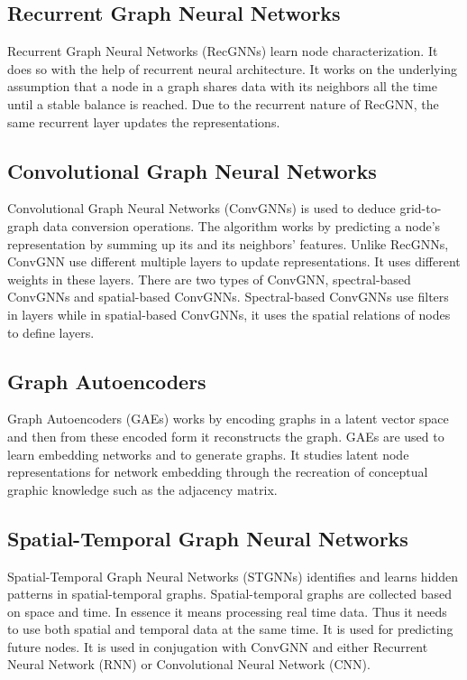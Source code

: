 \documentclass[journal,twoside,web]{ieeecolor}
\begin{document}
\subsection{Recurrent Graph Neural Networks}
Recurrent Graph Neural Networks (RecGNNs) learn node characterization. It does so with the help of recurrent neural architecture. It works on the underlying assumption that a node in a graph shares data with its neighbors all the time until a stable balance is reached. Due to the recurrent nature of RecGNN, the same recurrent layer updates the representations.

\subsection{Convolutional Graph Neural Networks}
Convolutional Graph Neural Networks (ConvGNNs) is used to deduce grid-to-graph data conversion operations. The algorithm works by predicting a node's representation by summing up its and its neighbors' features. Unlike RecGNNs, ConvGNN use different multiple layers to update representations. It uses different weights in these layers. There are two types of ConvGNN, spectral-based ConvGNNs and spatial-based ConvGNNs. Spectral-based ConvGNNs use filters in layers while in spatial-based ConvGNNs, it uses the spatial relations of nodes to define layers.

\subsection{Graph Autoencoders}
Graph Autoencoders (GAEs) works by encoding graphs in a latent vector space and then from these encoded form it reconstructs the graph. GAEs are used to learn embedding networks and to generate graphs. It studies latent node representations for network embedding through the recreation of conceptual graphic knowledge such as the adjacency matrix.

\subsection{Spatial-Temporal Graph Neural Networks}
Spatial-Temporal Graph Neural Networks (STGNNs) identifies and learns hidden patterns in spatial-temporal graphs. Spatial-temporal graphs are collected based on space and time. In essence it means processing real time data. Thus it needs to use both spatial and temporal data at the same time. It is used for predicting future nodes. It is used in conjugation with ConvGNN and either Recurrent Neural Network (RNN) or Convolutional Neural Network (CNN).
\end{document}

